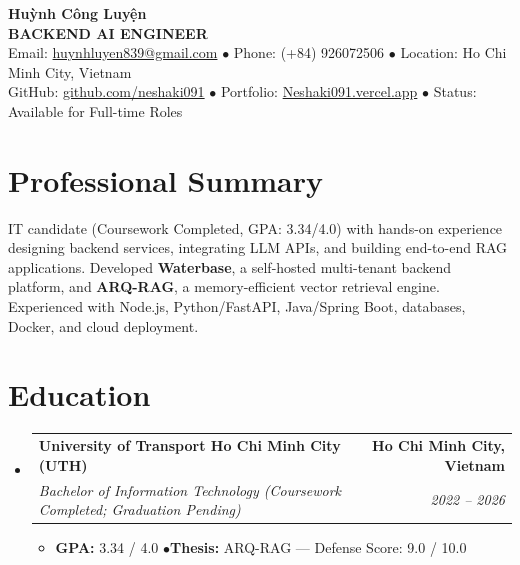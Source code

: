 \documentclass[10pt,letterpaper]{article}
\makeatletter
\newcommand{\resumeItemListStart}{\begin{itemize}[leftmargin=1.15em, label={\small$\bullet$}, itemsep=1.2pt, parsep=0pt, topsep=1.0pt, partopsep=0pt]}
\newcommand{\resumeItemListEnd}{\end{itemize}\vspace{-1pt}}
\newcommand{\resumeItem}[1]{\item \small{#1}}
\newcommand{\resumeSubheading}[4]{
  \item[]
  \begin{tabular*}{\textwidth}[t]{l@{\extracolsep{\fill}}r}
    \textbf{#1} & \textbf{\small #2} \\
    \textit{\small #3} & \textit{\small #4} \\
  \end{tabular*}\vspace{0.5pt}
}
\makeatother
\begin{document}
{\centering
  {\Large \textbf{Huỳnh Công Luyện}}\\[2pt]
  {\large \textbf{\color{secondary}BACKEND AI ENGINEER}} \\[3pt]
  \small{
    Email: \href{mailto:huynhluyen839@gmail.com}{huynhluyen839@gmail.com} \quad$\bullet$\quad
    Phone: (+84) 926072506 \quad$\bullet$\quad
    Location: Ho Chi Minh City, Vietnam
  }\\[1.8pt]
  \small{
    GitHub: \href{https://github.com/neshaki091}{github.com/neshaki091} \quad$\bullet$\quad
    Portfolio: \href{https://Neshaki091.vercel.app}{Neshaki091.vercel.app} \quad$\bullet$\quad
    Status: Available for Full-time Roles
  }\par
}
\vspace{2pt}

\section{Professional Summary}
\small{
IT candidate (Coursework Completed, GPA: 3.34/4.0) with hands-on experience designing backend services, integrating LLM APIs, and building end-to-end RAG applications. Developed \textbf{Waterbase}, a self-hosted multi-tenant backend platform, and \textbf{ARQ-RAG}, a memory-efficient vector retrieval engine. Experienced with Node.js, Python/FastAPI, Java/Spring Boot, databases, Docker, and cloud deployment.
}

\section{Education}
\begin{itemize}[leftmargin=0pt, label={}, topsep=1.0pt, partopsep=0pt, parsep=0pt]
  \resumeSubheading
    {University of Transport Ho Chi Minh City (UTH)}{Ho Chi Minh City, Vietnam}
    {Bachelor of Information Technology \textnormal{(Coursework Completed; Graduation Pending)}}{2022 -- 2026}
    \resumeItemListStart
      \resumeItem{\textbf{GPA:} 3.34 / 4.0 \quad$\bullet$\quad \textbf{Thesis:} ARQ-RAG --- Defense Score: 9.0 / 10.0}
    \resumeItemListEnd
\end{itemize}
\end{document}
